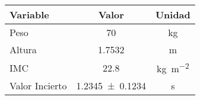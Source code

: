 \begin{tabular}{l S S}
    \toprule
    {Variable} & {Valor} & {Unidad} \\
    \midrule
    {Peso} & \num{70} & \si{\kilogram} \\
    {Altura} & \num{1.7532} & \si{\meter} \\
    {IMC} & \num{22.8} & \si{\kilo\gram\per\meter\squared} \\
    {Valor Incierto} & \num{1.2345\pm0.1234} & \si{\second} \\   
\end{tabular}